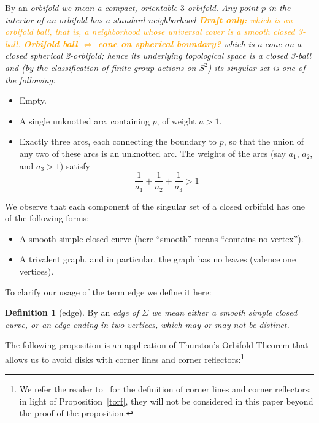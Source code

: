 \documentclass[12pt,reqno]{amsart}
\theoremstyle{plain}
\theoremstyle{definition}
\numberwithin{subcase}{case}
\theoremstyle{plain}
\theoremstyle{definition}
\newtheorem{defn}[thm]{Definition} %
\begin{document}
By an \em orbifold \em we mean a compact, orientable \(3\)-orbifold.
Any point \(p\) in the interior of an orbifold has a \em standard neighborhood \em
\ifDraft
\textcolor{orange}{\tiny{\bf Draft only:}
 which is an \em orbifold ball\em, that is, a neighborhood whose universal cover is a smooth closed 3-ball.  \bf Orbifold ball \(\Leftrightarrow\) cone on spherical boundary?}
 \fi
which is a cone on a closed spherical 2-orbifold; hence its underlying topological space is a  closed 3-ball and (by the classification of finite group actions on \(S^{2}\)) its singular set is one of the following:
	\begin{itemize}
	\item Empty.
	\item A single unknotted arc, containing \(p\), of weight \(a>1\).
	\item Exactly three arcs, each connecting the boundary to \(p\), so that the union of any two of these arcs is an unknotted arc.  
	The weights of the arcs (say \(a_{1}\), \(a_{2}\), and \(a_{3}>1\)) satisfy 
	\[
	\frac{1}{a_{1}} + \frac{1}{a_{2}} + \frac{1}{a_{3}} > 1
	\] 
	\end{itemize}	
We observe that each component of the singular set of a closed orbifold has one of the following forms:
	\begin{itemize}
	\item A smooth simple closed curve (here ``smooth'' means ``contains no vertex'').
	\item A trivalent graph, and in particular, the graph has no leaves (valence one vertices).
	\end{itemize}

To clarify our usage of the term edge we define it here:

\begin{defn}[edge]
\label{Definition:TypesOfEdges}
{\rm
By an \em edge \em of \(\Sigma\) we mean either a smooth simple closed curve, or an edge ending in two vertices, which may or may not be distinct.}
\end{defn}

\medskip\noindent
The following proposition is an application of Thurston's Orbifold Theorem that allows us to avoid disks with corner lines and corner reflectors:\footnote{We refer the reader to~\cite[page~408]{scott} for the definition of corner lines and corner reflectors; in light of Proposition~\ref{torf}, they will not be considered in this paper beyond the proof of the  proposition.}   
\end{document}
